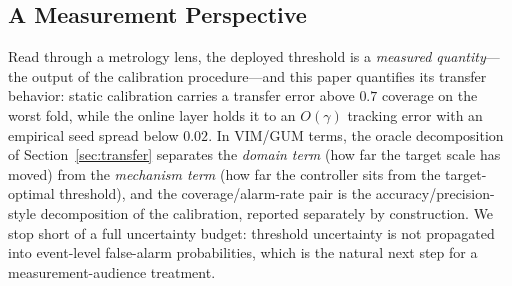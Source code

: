 \subsection{A Measurement Perspective}
Read through a metrology lens, the deployed threshold is a \emph{measured quantity}---the output of the calibration procedure---and this paper quantifies its transfer behavior: static calibration carries a transfer error above $0.7$ coverage on the worst fold, while the online layer holds it to an $O(\gamma)$ tracking error with an empirical seed spread below $0.02$. In VIM/GUM terms, the oracle decomposition of Section~\ref{sec:transfer} separates the \emph{domain term} (how far the target scale has moved) from the \emph{mechanism term} (how far the controller sits from the target-optimal threshold), and the coverage/alarm-rate pair is the accuracy/precision-style decomposition of the calibration, reported separately by construction. We stop short of a full uncertainty budget: threshold uncertainty is not propagated into event-level false-alarm probabilities, which is the natural next step for a measurement-audience treatment.

